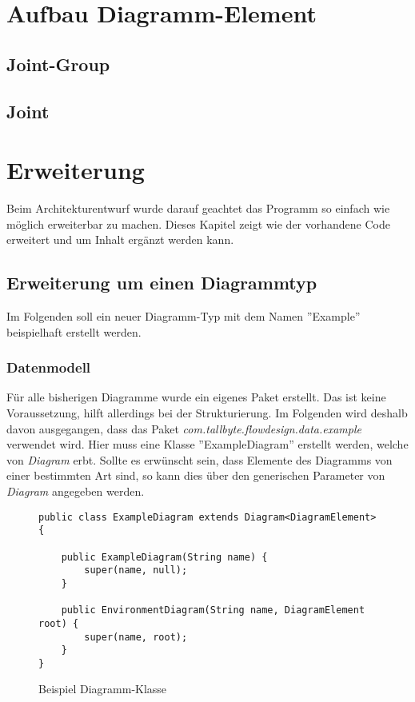 \section{Aufbau Diagramm-Element}
\subsection{Joint-Group}

\subsection{Joint}

\section{Erweiterung}
Beim Architekturentwurf wurde darauf geachtet das Programm so einfach wie möglich erweiterbar zu machen.
Dieses Kapitel zeigt wie der vorhandene Code erweitert und um Inhalt ergänzt werden kann.

\subsection{Erweiterung um einen Diagrammtyp}
Im Folgenden soll ein neuer Diagramm-Typ mit dem Namen ''Example'' beispielhaft erstellt werden.

\subsubsection{Datenmodell}
Für alle bisherigen Diagramme wurde ein eigenes Paket erstellt. Das ist keine Voraussetzung, hilft allerdings bei der
Strukturierung. Im Folgenden wird deshalb davon ausgegangen, dass das Paket \textit{com.tallbyte.flowdesign.data.example}
verwendet wird.
Hier muss eine Klasse ''ExampleDiagram'' erstellt werden, welche von \textit{Diagram} erbt. Sollte es erwünscht sein,
dass Elemente des Diagramms von einer bestimmten Art sind, so kann dies über den generischen Parameter von 
\textit{Diagram} angegeben werden.

\begin{figure}[h!]
	\centering
	\begin{lstlisting}
public class ExampleDiagram extends Diagram<DiagramElement> {

    public ExampleDiagram(String name) {
        super(name, null);
    }

    public EnvironmentDiagram(String name, DiagramElement root) {
        super(name, root);
    }
}
	\end{lstlisting}
	\caption{Beispiel Diagramm-Klasse}
\end{figure}

